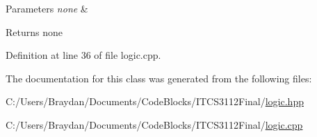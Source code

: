 \begin{DoxyParams}{Parameters}
{\em none} & \\
\hline
\end{DoxyParams}
\begin{DoxyReturn}{Returns}
none 
\end{DoxyReturn}


Definition at line 36 of file logic.\+cpp.



The documentation for this class was generated from the following files\+:\begin{DoxyCompactItemize}
\item 
C\+:/\+Users/\+Braydan/\+Documents/\+Code\+Blocks/\+I\+T\+C\+S3112\+Final/\mbox{\hyperlink{logic_8hpp}{logic.\+hpp}}\item 
C\+:/\+Users/\+Braydan/\+Documents/\+Code\+Blocks/\+I\+T\+C\+S3112\+Final/\mbox{\hyperlink{logic_8cpp}{logic.\+cpp}}\end{DoxyCompactItemize}
